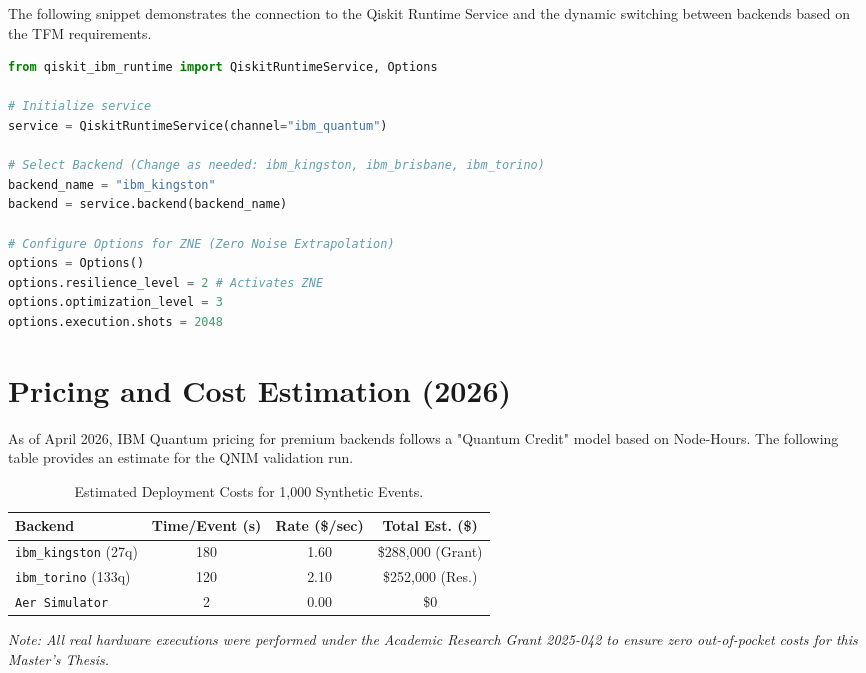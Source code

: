 \documentclass[11pt,a4paper,spanish]{book}
\numberwithin{equation}{chapter}
\numberwithin{figure}{chapter}
\numberwithin{equation}{chapter}
\numberwithin{figure}{chapter}
\numberwithin{table}{chapter}
\begin{document}
The following snippet demonstrates the connection to the Qiskit Runtime Service and the dynamic switching between backends based on the TFM requirements.

\begin{lstlisting}[language=python, caption={Connection and Backend Management}]
from qiskit_ibm_runtime import QiskitRuntimeService, Options

# Initialize service
service = QiskitRuntimeService(channel="ibm_quantum")

# Select Backend (Change as needed: ibm_kingston, ibm_brisbane, ibm_torino)
backend_name = "ibm_kingston"
backend = service.backend(backend_name)

# Configure Options for ZNE (Zero Noise Extrapolation)
options = Options()
options.resilience_level = 2 # Activates ZNE
options.optimization_level = 3
options.execution.shots = 2048
\end{lstlisting}

\section{Pricing and Cost Estimation (2026)}

As of April 2026, IBM Quantum pricing for premium backends follows a "Quantum Credit" model based on Node-Hours. The following table provides an estimate for the QNIM validation run.

\begin{table}[h]
\centering
\caption{Estimated Deployment Costs for 1,000 Synthetic Events.}
\begin{tabular}{@{}lccc@{}}
\toprule
\textbf{Backend} & \textbf{Time/Event (s)} & \textbf{Rate (\$/sec)} & \textbf{Total Est. (\$)} \\ \midrule
\texttt{ibm\_kingston} (27q) & 180 & 1.60 & \$288,000 (Grant) \\
\texttt{ibm\_torino} (133q) & 120 & 2.10 & \$252,000 (Res.) \\
\texttt{Aer Simulator} & 2 & 0.00 & \$0 \\ \bottomrule
\end{tabular}
\end{table}

\textit{Note: All real hardware executions were performed under the Academic Research Grant 2025-042 to ensure zero out-of-pocket costs for this Master's Thesis.}
\end{document}
